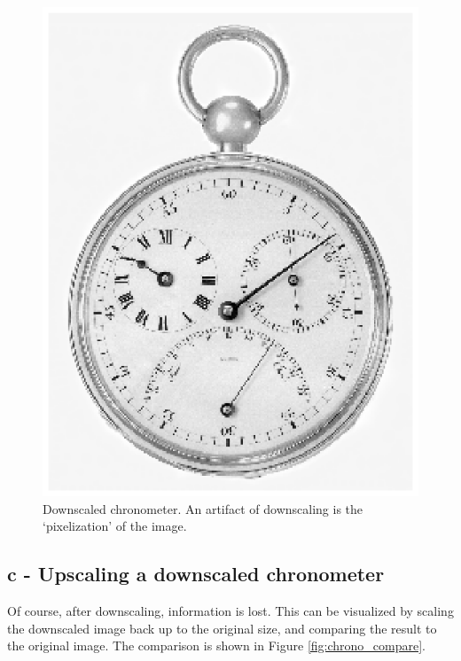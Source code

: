 \begin{figure}[!Htb]
 \centering
 \includegraphics{scaledDownChrono.eps}
 \caption{Downscaled chronometer. An artifact of downscaling is the `pixelization' of the image.}
 \label{fig:chrono_down}
\end{figure}

\clearpage

\subsection*{c - Upscaling a downscaled chronometer}
Of course, after downscaling, information is lost. This can be visualized by scaling the downscaled image back up to the original size, and comparing the result to the original image. The comparison is shown in Figure \ref{fig:chrono_compare}.

